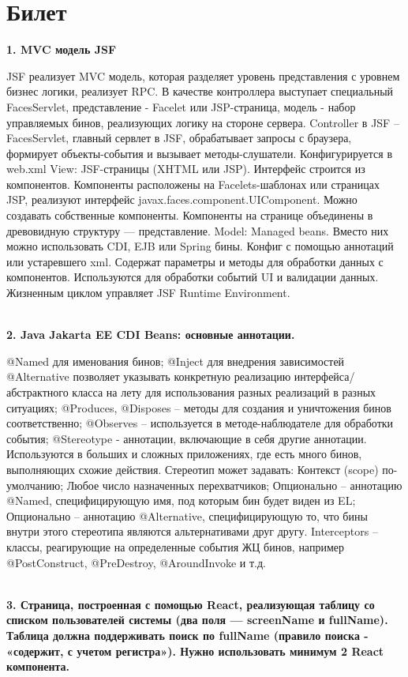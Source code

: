 \documentclass{article}
\newcommand{\bil}[5]{%
        \section{Билет}
        \textbf{1. #1}

        #4
        \\
        \textbf{2. #2}
        
        #5
        \\
        \textbf{3. #3}
}
\begin{document}
\bil{MVC модель JSF}
{Java Jakarta EE CDI Beans: основные аннотации.}
{Страница, построенная с помощью React, реализующая таблицу со списком пользователей системы (два поля — screenName и fullName). Таблица должна поддерживать поиск по fullName (правило поиска - «содержит, с учетом регистра»). Нужно использовать минимум 2 React компонента.}{
    JSF реализует MVC модель, которая разделяет уровень представления с уровнем бизнес логики, реализует RPC. В качестве контроллера выступает специальный FacesServlet, представление - Facelet или JSP-страница, модель - набор управляемых бинов, реализующих логику на стороне сервера. 
Controller в JSF – FacesServlet, главный сервлет в JSF, обрабатывает запросы с браузера, формирует объекты-события и вызывает методы-слушатели. Конфигурируется в web.xml
View: JSF-страницы (XHTML или JSP).
Интерфейс строится из компонентов.
Компоненты расположены на Facelets-шаблонах или страницах JSP, реализуют интерфейс javax.faces.component.UIComponent.
Можно создавать собственные компоненты.
Компоненты на странице объединены в древовидную структуру — представление.
Model: Managed beans. Вместо них можно использовать CDI, EJB или Spring бины.
Конфиг с помощью аннотаций или устаревшего xml.
Содержат параметры и методы для обработки данных с компонентов.
Используются для обработки событий UI и валидации данных.
Жизненным циклом управляет JSF Runtime Environment.
}{
    @Named для именования бинов; @Inject для внедрения зависимостей
@Alternative позволяет указывать конкретную реализацию интерфейса/абстрактного класса на лету для использования разных реализаций в разных ситуациях;
@Produces, @Disposes – методы для создания и уничтожения бинов соответственно;
@Observes – используется в методе-наблюдателе для обработки события;
@Stereotype - аннотации, включающие в себя другие аннотации. Используются в больших и сложных приложениях, где есть много бинов, выполняющих схожие действия.
Стереотип может задавать: Контекст (scope) по-умолчанию;
Любое число назначенных перехватчиков;
Опционально – аннотацию @Named, специфицирующую имя, под которым бин будет виден из EL;
Опционально – аннотацию @Alternative, специфицирующую то, что бины внутри этого стереотипа являются альтернативами друг другу.
Interceptors – классы, реагирующие на определенные события ЖЦ бинов, например @PostConstruct, @PreDestroy, @AroundInvoke и т.д.
}
\end{document}
